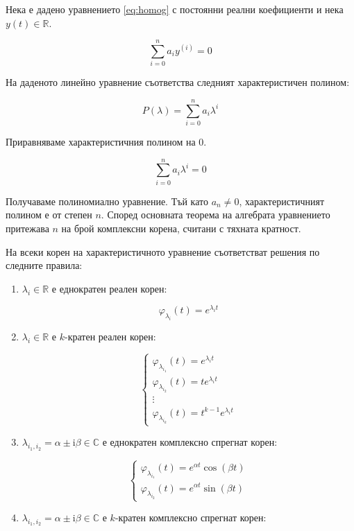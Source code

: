 \documentclass{scrartcl}
\begin{document}
\begin{FlushLeft}
Нека е дадено уравнението \eqref{eq:homog} с постоянни реални коефициенти и нека $y(t) \in \mathbb{R}$.

$$\sum_{i=0}^n a_i y^{(i)} = 0$$

На даденото линейно уравнение съответства следният характеристичен полином:

$$P(\lambda) = \sum_{i=0}^n a_i \lambda^i$$

Приравняваме характеристичния полином на $0$.

$$\sum_{i=0}^n a_i \lambda^{i} = 0$$

Получаваме полиномиално уравнение. Тъй като $a_n \ne 0$, характеристичният полином е от степен $n$. Според основната теорема на алгебрата уравнението притежава $n$ на брой комплексни корена, считани с тяхната кратност.

На всеки корен на характеристичното уравнение съответстват решения по следните правила:

\begin{enumerate}
    \item $\lambda_i \in \mathbb{R}$ е еднократен реален корен:
    
    $$\varphi_{\lambda_i}(t) = e^{\lambda_i t}$$
    
    \item $\lambda_{i} \in \mathbb{R}$ е $k$-кратен реален корен:

    $$
    \begin{cases}
        \varphi_{\lambda_{i_1}}(t) = e^{\lambda_i t}\\
        \varphi_{\lambda_{i_2}}(t) = te^{\lambda_i t}\\
        \vdots\\
        \varphi_{\lambda_{i_k}}(t) = t^{k-1}e^{\lambda_i t}
    \end{cases}
    $$
    
    \item $\lambda_{i_1, i_2} = \alpha \pm \mathrm{i} \beta\in \mathbb{C}$ е еднократен комплексно спрегнат корен:

    $$
    \begin{cases}
        \varphi_{\lambda_{i_1}}(t) = e^{\alpha t}\cos{(\beta t)}\\
        \varphi_{\lambda_{i_2}}(t) = e^{\alpha t}\sin{(\beta t)}
    \end{cases}
    $$
    
    \item $\lambda_{i_1, i_2} = \alpha \pm \mathrm{i} \beta\in \mathbb{C}$ е $k$-кратен комплексно спрегнат корен:


\end{enumerate}
\end{FlushLeft}
\end{document}
